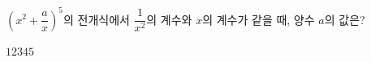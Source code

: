 $\left(x^2+\dfrac{a}{x}\right)^5$의 전개식에서 $\dfrac{1}{x^2}$의 계수와 $x$의 계수가 같을 때, 양수 $a$의 값은?
\begin{choices32}{$1$}{$2$}{$3$}{$4$}{$5$}\end{choices32}
